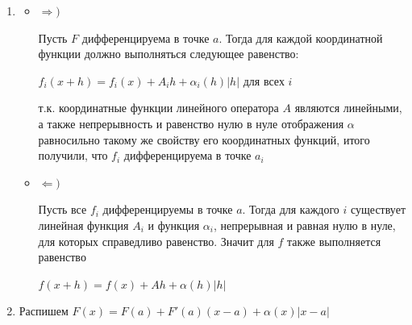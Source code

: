 \documentclass{article}
\begin{document}
            \begin{enumerate}
            
                \item 
                    
                    \begin{itemize}
                    
                        \item $\Rightarrow)$
                        
                            Пусть $F$ дифференцируема в точке $a$. Тогда для каждой координатной функции должно выполняться следующее равенство:
                            
                            $f_i(x + h) = f_i(x) + A_ih + \alpha_i(h) |h|$ для всех $i$
                            
                            т.к. координатные функции линейного оператора $A$ являются линейными, а также непрерывность и равенство нулю в нуле отображения $\alpha$ равносильно такому же свойству его координатных функций, итого получили, что $f_i$ дифференцируема в точке $a_i$
                            
                        \item $\Leftarrow)$
                        
                            Пусть все $f_i$ дифференцируемы в точке $a$. Тогда для каждого $i$ существует линейная функция $A_i$ и функция $\alpha_i$, непрерывная и равная нулю в нуле, для которых справедливо равенство. Значит для $f$ также выполняется равенство
                            
                            $f(x + h) = f(x) + Ah + \alpha(h) |h|$
                            
                    \end{itemize}
                    
                \item
                
                    Распишем $F(x) = F(a) + F'(a)(x - a) + \alpha(x) |x - a|$
                    

\end{enumerate}
\end{document}
